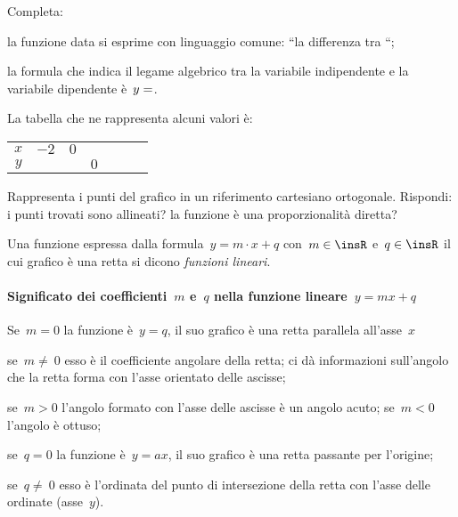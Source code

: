 Completa:
\begin{itemize*}
\item la funzione data si esprime con linguaggio comune: ``la differenza tra 
\dotfill``;
\item la formula che indica il legame algebrico tra la variabile indipendente e 
la variabile dipendente è~$y=\dotfill$.
\end{itemize*}
La tabella che ne rappresenta alcuni valori è:
\begin{center}
 \begin{tabular}{ccccccc}
 \toprule
 $x$ & $-2$ & $0$ & & & & \\
 $y$ & & & $0$ & & & \\
 \bottomrule
 \end{tabular}
\end{center}
Rappresenta i punti del grafico in un riferimento cartesiano ortogonale.
Rispondi: i punti trovati sono allineati? la funzione è una proporzionalità 
diretta?

\begin{definizione}
Una funzione espressa dalla formula~$y=m\cdot x+q$ con~$m\in \insR$ e~$q\in 
\insR$ il cui grafico è una retta si dicono
\emph{funzioni lineari}.
\end{definizione}

\paragraph{Significato dei coefficienti~$m$ e~$q$ nella funzione lineare~$y = 
mx+q$}

\begin{itemize*}
 \item Se~$m=0$ la funzione è~$y=q$, il suo grafico è una retta parallela 
all'asse~$x$
 \item se~$m\neq~0$ esso è il coefficiente angolare della retta; ci dà 
informazioni sull'angolo che la retta
 forma con l'asse orientato delle ascisse;
 \item se~$m>0$ l'angolo formato con l'asse delle ascisse è un angolo acuto; 
se~$m<0$ l'angolo è ottuso;
 \item se~$q=0$ la funzione è~$y=ax$, il suo grafico è una retta passante per 
l'origine;
 \item se~$q\neq~0$ esso è l'ordinata del punto di intersezione della retta con 
l'asse delle ordinate (asse~$y$).
\end{itemize*}
\begin{center}
 
\end{center}

